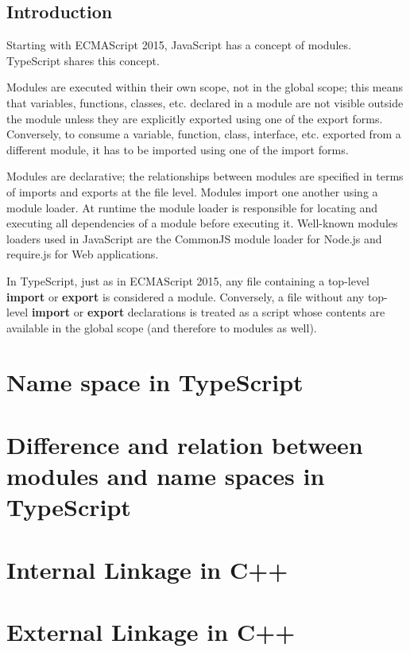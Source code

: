 \documentclass[a4paper]{report}
\begin{document}
\subsection{Introduction}
Starting with ECMAScript 2015, JavaScript has a concept of modules. TypeScript shares this concept.
\par
Modules are executed within their own scope, not in the global scope; this means that variables, functions, classes, etc. declared in a module are not visible outside the module unless they are explicitly exported using one of the \textcolor[rgb]{0.749,0.255,0.29}{export} forms. Conversely, to consume a variable, function, class, interface, etc. exported from a different module, it has to be imported using one of the \textcolor[rgb]{0.749,0.255,0.29}{import} forms.
\par
Modules are declarative; the relationships between modules are specified in terms of imports and exports at the file level.
Modules import one another using a module loader. At runtime the module loader is responsible for locating and executing all dependencies of a module before executing it. Well-known modules loaders used in JavaScript are the CommonJS module loader for Node.js and require.js for Web applications.
\par
In TypeScript, just as in ECMAScript 2015, any file containing a top-level \textcolor[rgb]{0.749,0.255,0.29}{\textbf{import}} or \textcolor[rgb]{0.749,0.255,0.29}{\textbf{export}} is considered a module. Conversely, a file without any top-level \textcolor[rgb]{0.749,0.255,0.29}{\textbf{import}} or \textcolor[rgb]{0.749,0.255,0.29}{\textbf{export}} declarations is treated as a script whose contents are available in the global scope (and therefore to modules as well).
\section{Name space in TypeScript}

\section{Difference and relation between modules and name spaces in TypeScript}

\section{Internal Linkage in C++}

\section{External Linkage in C++}
\end{document}
